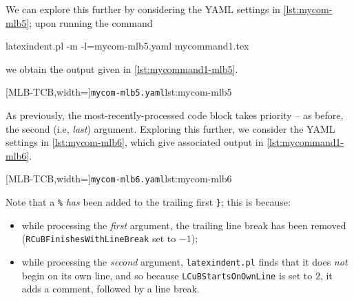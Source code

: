  \begin{example}
 We can explore this further by considering the YAML settings in \cref{lst:mycom-mlb5};
 upon running the command  

 \begin{commandshell}
latexindent.pl -m -l=mycom-mlb5.yaml mycommand1.tex
\end{commandshell}

 we obtain the output given in \cref{lst:mycommand1-mlb5}.

 \begin{cmhtcbraster}[raster column skip=.1\linewidth]
  [MLB-TCB,width=\linewidth]{\texttt{mycom-mlb5.yaml}}{lst:mycom-mlb5}
 \end{cmhtcbraster}

 As previously, the most-recently-processed code block takes priority -- as before, the
 second (i.e, \emph{last}) argument. Exploring this further, we consider the YAML settings
 in \cref{lst:mycom-mlb6}, which give associated output in \cref{lst:mycommand1-mlb6}.

 \begin{cmhtcbraster}[raster column skip=.1\linewidth]
  [MLB-TCB,width=\linewidth]{\texttt{mycom-mlb6.yaml}}{lst:mycom-mlb6}
 \end{cmhtcbraster}

 Note that a \lstinline!%! \emph{has} been added to the trailing first \lstinline!}!; this
 is because:
 \begin{itemize}
  \item while processing the \emph{first} argument, the trailing line break has been removed
        (\texttt{RCuBFinishesWithLineBreak} set to $-1$);
  \item while processing the \emph{second} argument, \texttt{latexindent.pl} finds that it does
        \emph{not} begin on its own line, and so because \texttt{LCuBStartsOnOwnLine} is set to
        $2$, it adds a comment, followed by a line break.
 \end{itemize}
 \end{example}


